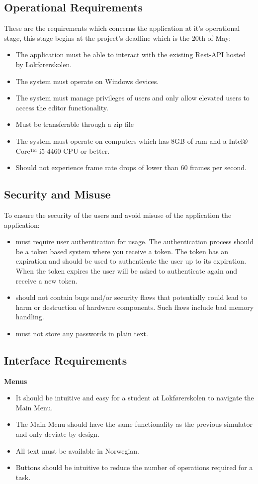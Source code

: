 \subsection{Operational Requirements}
These are the requirements which concerns the application at it's operational stage, this stage begins at the project's deadline which is the 20th of May:
\begin{itemize}
    \item The application must be able to interact with the existing Rest-API hosted by Lokførerskolen.
    \item The system must operate on Windows devices.
    \item The system must manage privileges of users and only allow elevated users to access the editor functionality.
    \item Must be transferable through a zip file
    \item The system must operate on computers which has 8GB of ram and a Intel® Core™ i5-4460 CPU or better. 
    \item Should not experience frame rate drops of lower than 60 frames per second. 
\end{itemize} 


\subsection{Security and Misuse}
\label{OperationalRequirements}
To ensure the security of the users and avoid misuse of the application the application:
\begin{itemize}
    \item must require user authentication for usage. The authentication process should be a token based system where you receive a token. The token has an expiration and should be used to authenticate the user up to its expiration. When the token expires the user will be asked to authenticate again and receive a new token. %
    \item should not contain bugs and/or security flaws that potentially could lead to harm or destruction of hardware components. Such flaws include bad memory handling.
    \item must not store any passwords in plain text.
\end{itemize}


\subsection{Interface Requirements}
\textbf{Menus} 
\begin{itemize}
    \item It should  be intuitive and easy for a student at Lokførerskolen to navigate the Main Menu. 
    \item The Main Menu should have the same functionality as the previous simulator and only deviate by design.
    \item All text must be available in Norwegian.
    \item Buttons should be intuitive to reduce the number of operations required for a task.
\end{itemize}

